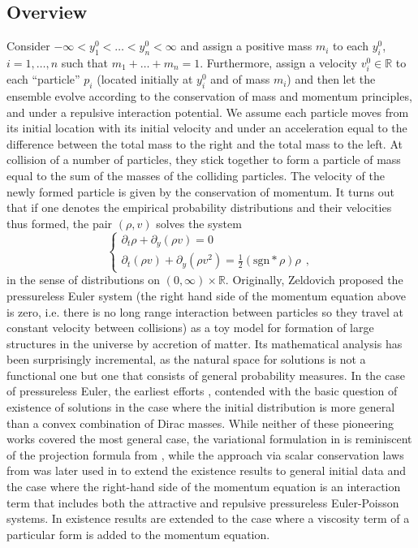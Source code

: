 \documentclass[11pt]{article}
\numberwithin{equation}{section}
\begin{document}
    \subsection{Overview}
    Consider $-\infty<y^0_1<\ldots<y^0_n<\infty$ and assign a positive mass $m_i$ to each $y_i^0$, $i=1,\ldots,n$ such that $m_1+\ldots+m_n=1$. Furthermore, assign a velocity $v^0_i\in\mathbb{R}$ to each ``particle'' $p_i$ (located initially at $y^0_i$ and of mass $m_i$) and then let the ensemble evolve according to the conservation of mass and momentum principles, and under a repulsive interaction potential. We assume each particle moves from its initial location with its initial velocity and under an acceleration equal to the difference between the total mass to the right and the total mass to the left. At collision of a number of particles, they stick together to form a particle of mass equal to the sum of the masses of the colliding particles. The velocity of the newly formed particle is given by the conservation of momentum. It turns out that if one denotes the empirical probability distributions and their velocities thus formed, the pair $(\rho,v)$ solves the system
    \begin{equation}\label{PEP}
        \begin{cases}\partial_t \rho +   \partial_y(\rho v)=0 \\
        \partial_t(\rho v)+\partial_y(\rho v^2)=\frac12 (\text{sgn}*\rho)\rho~~,
    \end{cases}
    \end{equation}
    in the sense of distributions on $(0,\infty)\times\mathbb{R}$. 
    Originally, Zeldovich \cite{Zeldovich} proposed the pressureless Euler system (the right hand side of the momentum equation above is zero, i.e. there is no long range interaction between particles so they travel at constant velocity between collisions) as a toy model for formation of large structures in the universe by accretion of matter. Its mathematical analysis has been surprisingly incremental, as the natural space for solutions is not a functional one but one that consists of general probability measures. In the case of pressureless Euler, the earliest efforts \cite{ERS}, \cite{BrenGren} contended with the basic question of existence of solutions in the case where the initial distribution is more general than a convex combination of Dirac masses. While neither of these pioneering works covered the most general case, the variational formulation in \cite{ERS} is reminiscent of the projection formula from \cite{Natile-Savare}, \cite{BLPTW} while the approach via scalar conservation laws from \cite{BrenGren} was later used in \cite{Tudorascu-2008} to extend the existence results to general initial data and the case where the right-hand side of the momentum equation is an interaction term that includes both the attractive and repulsive pressureless Euler-Poisson systems. In \cite{Tudorascu2015} existence results are extended to the case where a viscosity term of a particular form is added to the momentum equation. 
\end{document}
